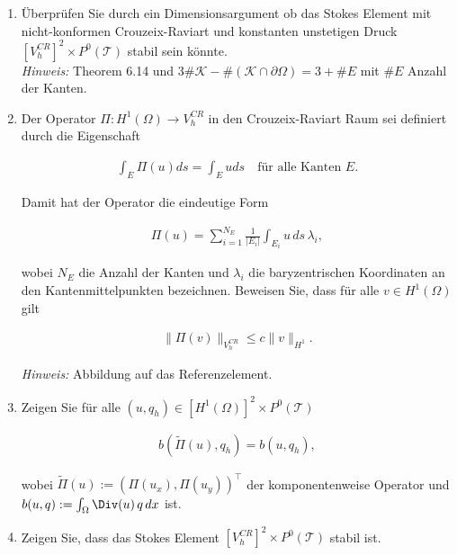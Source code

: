 
\begin{exercise}

\phantom{}

\begin{enumerate}[label = \textbf{\alph*)}]
  \item Überprüfen Sie durch ein Dimensionsargument ob das Stokes Element mit
  nicht-konformen Crouzeix-Raviart und konstanten unstetigen Druck
  $[V_h^{CR}]^2 \times P^0(\mathcal{T})$ stabil sein könnte. \\
  \textit{Hinweis:} Theorem 6.14 und
  $3\#\mathcal{K} - \#(\mathcal{K}\cap \partial\Omega) = 3 + \# E$ mit $\# E$
  Anzahl der Kanten.
  \item Der Operator $\Pi: H^1(\Omega) \to V_h^{CR}$ in den Crouzeix-Raviart Raum
  sei definiert durch die Eigenschaft

  \begin{align}
    \int_E \Pi(u) ds = \int_E u ds \quad \text{für alle Kanten } E.
  \end{align}

  Damit hat der Operator die eindeutige Form

  \begin{align}
    \Pi(u) = \sum_{i=1}^{N_E} \frac{1}{|E_i|}\int_{E_i} u\, ds\, \lambda_i,
  \end{align}

  wobei $N_E$ die Anzahl der Kanten und $\lambda_i$ die baryzentrischen Koordinaten
  an den Kantenmittelpunkten bezeichnen. Beweisen Sie, dass für alle $v \in H^1(\Omega)$ gilt

  \begin{align}
    \|\Pi(v)\|_{V_h^{CR}} \leq c\|v\|_{H^1}.
  \end{align}

    \textit{Hinweis:} Abbildung auf das Referenzelement.

    \item Zeigen Sie für alle $(u,q_h) \in [H^1(\Omega)]^2 \times P^0(\mathcal{T})$

    \begin{align}
      b(\tilde{\Pi}(u),q_h) = b(u,q_h),
    \end{align}

    wobei $\tilde{\Pi}(u) := (\Pi(u_x),\Pi(u_y))^\top$ der komponentenweise
    Operator und $b(u,q) := \int_\Omega \Div(u)\, q\, dx$ ist.

    \item Zeigen Sie, dass das Stokes Element $[V_h^{CR}]^2 \times P^0(\mathcal{T})$ stabil ist.

\end{enumerate}

\end{exercise}

